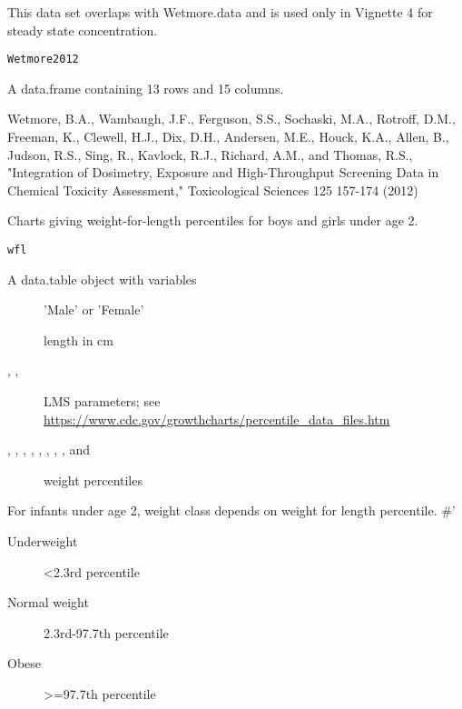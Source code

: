 \documentclass[a4paper]{book}
\begin{document}
%
\begin{Description}\relax
This data set overlaps with Wetmore.data and is used only in Vignette 4 for
steady state concentration.
\end{Description}
%
\begin{Usage}
\begin{verbatim}
Wetmore2012
\end{verbatim}
\end{Usage}
%
\begin{Format}
A data.frame containing 13 rows and 15 columns.
\end{Format}
%
\begin{References}\relax
Wetmore, B.A., Wambaugh, J.F., Ferguson, S.S., Sochaski, M.A.,
Rotroff, D.M., Freeman, K., Clewell, H.J., Dix, D.H., Andersen, M.E., Houck,
K.A., Allen, B., Judson, R.S., Sing, R., Kavlock, R.J., Richard, A.M., and
Thomas, R.S., "Integration of Dosimetry, Exposure and High-Throughput
Screening Data in Chemical Toxicity Assessment," Toxicological Sciences 125
157-174 (2012)
\end{References}
%
\begin{Description}\relax
Charts giving weight-for-length percentiles for boys and girls under age 2.
\end{Description}
%
\begin{Usage}
\begin{verbatim}
wfl
\end{verbatim}
\end{Usage}
%
\begin{Format}
A data.table object with variables \begin{description}
 \item[] 'Male'
or 'Female'\item[] length in cm\item[, ,
] LMS parameters; see
\url{https://www.cdc.gov/growthcharts/percentile_data_files.htm}\item[,
, , , , , ,
, and ] weight percentiles
\end{description}

\end{Format}
%
\begin{Details}\relax
For infants under age 2, weight class depends on weight for length percentile.
\#'\begin{description}
 \item[Underweight] <2.3rd percentile\item[Normal
weight] 2.3rd-97.7th percentile\item[Obese] >=97.7th percentile
\end{description}

\end{Details}
\end{document}
